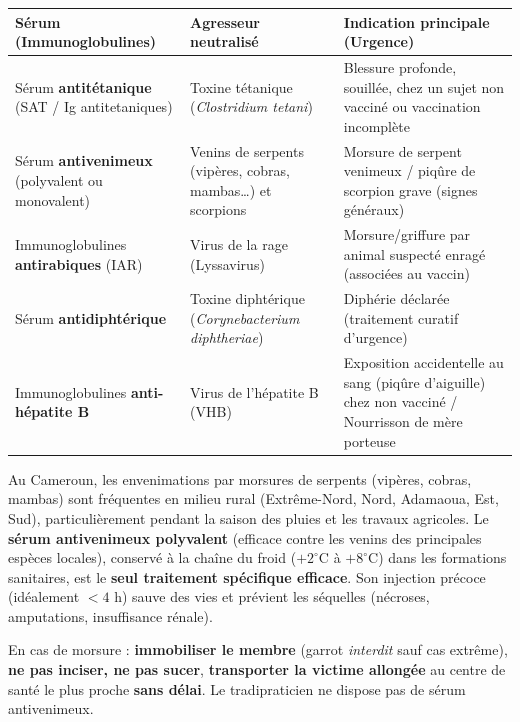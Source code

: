 \documentclass[11pt]{article}
\begin{document}
\begin{center}
\begin{tabularx}{\linewidth}{|l|X|X|}
\hline
\rowcolor{popblueL} \textbf{Sérum (Immunoglobulines)} & \textbf{Agresseur neutralisé} & \textbf{Indication principale (Urgence)} \\
\hline
Sérum \textbf{antitétanique} (SAT / Ig antitetaniques) & Toxine tétanique (\emph{Clostridium tetani}) & Blessure profonde, souillée, chez un sujet non vacciné ou vaccination incomplète \\
\hline
Sérum \textbf{antivenimeux} (polyvalent ou monovalent) & Venins de serpents (vipères, cobras, mambas\ldots) et scorpions & Morsure de serpent venimeux / piqûre de scorpion grave (signes généraux) \\
\hline
Immunoglobulines \textbf{antirabiques} (IAR) & Virus de la rage (Lyssavirus) & Morsure/griffure par animal suspecté enragé (associées au vaccin) \\
\hline
Sérum \textbf{antidiphtérique} & Toxine diphtérique (\emph{Corynebacterium diphtheriae}) & Diphérie déclarée (traitement curatif d'urgence) \\
\hline
Immunoglobulines \textbf{anti-hépatite B} & Virus de l'hépatite B (VHB) & Exposition accidentelle au sang (piqûre d'aiguille) chez non vacciné / Nourrisson de mère porteuse \\
\hline
\end{tabularx}
\end{center}

\begin{exemplebox}
Au Cameroun, les envenimations par morsures de serpents (vipères, cobras, mambas) sont fréquentes en milieu rural (Extrême-Nord, Nord, Adamaoua, Est, Sud), particulièrement pendant la saison des pluies et les travaux agricoles. Le \textbf{sérum antivenimeux polyvalent} (efficace contre les venins des principales espèces locales), conservé à la chaîne du froid ($+2^\circ\text{C}$ à $+8^\circ\text{C}$) dans les formations sanitaires, est le \textbf{seul traitement spécifique efficace}. Son injection précoce (idéalement $< 4$ h) sauve des vies et prévient les séquelles (nécroses, amputations, insuffisance rénale).
\begin{attention}
En cas de morsure : \textbf{immobiliser le membre} (garrot \emph{interdit} sauf cas extrême), \textbf{ne pas inciser, ne pas sucer}, \textbf{transporter la victime allongée} au centre de santé le plus proche \textbf{sans délai}. Le tradipraticien ne dispose pas de sérum antivenimeux.
\end{attention}
\end{exemplebox}
\end{document}
